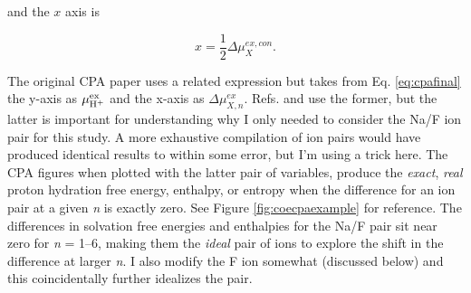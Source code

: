 \begin{cpa}
  \noindent and the $x$ axis is 
  
  \begin{equation}
    x=\frac{1}{2} \Delta \mu_{X}^{ex,con}.
    \label{eq:xdata}
  \end{equation}

  \noindent The original CPA paper\cite{coe1998cpa1} uses a related expression but takes from Eq. \ref{eq:cpafinal} the y-axis as $\mu^{\mathrm{ex}}_{\mathrm{H^{\mathrm{+}}}}$
  and the x-axis as $\Delta\mu_{X,n}^{ex}$. Refs. \cite{pollard2014cpa1} and \cite{pollard2014cpa2} use the former, but the latter is 
  important for understanding why I only needed to consider the Na\sur{+}/F\sur{-} ion pair for this study. A more exhaustive compilation
  of ion pairs would have produced identical results to within some error, but I'm using a trick here. The CPA figures when plotted with the
  latter pair of variables, produce the \emph{exact}, \emph{real} proton hydration free energy, enthalpy, or entropy when the difference 
  for an ion pair at a given \emph{n} is exactly zero. See Figure \ref{fig:coecpaexample} for reference. The differences in solvation free energies
  and enthalpies for the Na\sur{+}/F\sur{-} pair sit near zero for \emph{n} = 1--6, making them the \emph{ideal} pair of ions to explore the shift
  in the difference at larger \emph{n}. I also modify the F\sur{-} ion somewhat (discussed below) and this coincidentally further idealizes the pair.
  

\end{cpa}
